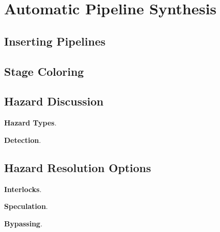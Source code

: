 \section{Automatic Pipeline Synthesis}

\subsection{Inserting Pipelines}

\subsection{Stage Coloring}

\subsection{Hazard Discussion}

{\bf Hazard Types}.

{\bf Detection}.

\subsection{Hazard Resolution Options}

{\bf Interlocks}.

{\bf Speculation}.

{\bf Bypassing}.
